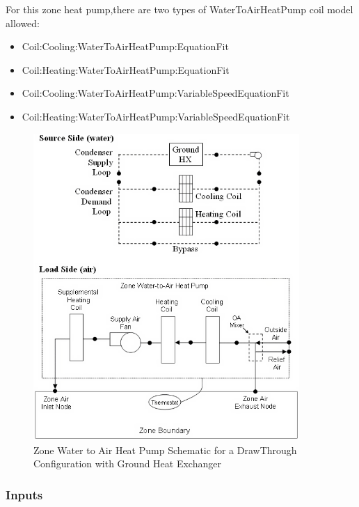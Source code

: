 For this zone heat pump,there are two types of WaterToAirHeatPump coil model allowed:

\begin{itemize}
\item
  Coil:Cooling:WaterToAirHeatPump:EquationFit
\item
  Coil:Heating:WaterToAirHeatPump:EquationFit
\item
  Coil:Cooling:WaterToAirHeatPump:VariableSpeedEquationFit
\item
  Coil:Heating:WaterToAirHeatPump:VariableSpeedEquationFit
\end{itemize}

\begin{figure}[hbtp] %
\centering
\includegraphics[width=0.9\textwidth, height=0.9\textheight, keepaspectratio=true]{media/image288.png}
\caption{Zone Water to Air Heat Pump Schematic for a DrawThrough Configuration with Ground Heat Exchanger \protect \label{fig:zone-water-to-air-heat-pump-schematic-for-a}}
\end{figure}

\subsubsection{Inputs}\label{inputs-11-023}

